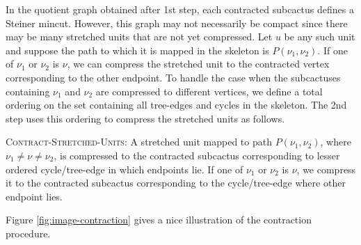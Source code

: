 In the quotient graph obtained after 1st step, each contracted subcactus defines a Steiner mincut. 
However, this graph may not necessarily be compact since there may be many stretched units that are not yet compressed. 
Let $u$ be any such unit and suppose
the path to which it is mapped in the skeleton is $P(\nu_1,\nu_2)$. If one of $\nu_1$ or $\nu_2$ is $\nu$, we can compress the stretched unit to the contracted vertex corresponding to the other endpoint. To handle the case when the subcactuses containing $\nu_1$ and $\nu_2$ are compressed to different vertices,
we define a total ordering on the set containing all tree-edges and cycles in the skeleton. The 2nd step uses this ordering to compress the stretched units as follows.


{\textsc{Contract-Stretched-Units}}: A stretched unit mapped to path $P(\nu_1,\nu_2)$, where $\nu_1\neq \nu \neq \nu_2$, is compressed to the contracted subcactus corresponding to lesser ordered cycle/tree-edge in which endpoints lie. If one of $\nu_1$ or $\nu_2$ is $\nu$, we compress it to the contracted subcactus corresponding to the cycle/tree-edge where other endpoint lies.

Figure \ref{fig:image-contraction} gives a nice illustration of the contraction procedure.

